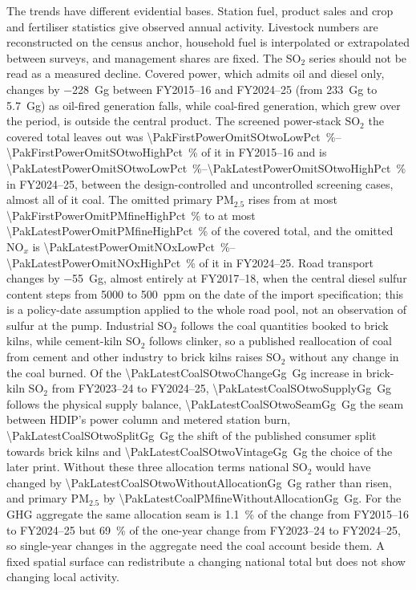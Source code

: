 \documentclass[essd,manuscript]{copernicus}
\begin{document}
The trends have different evidential bases. Station fuel, product sales and crop and fertiliser statistics give observed annual activity. Livestock numbers are reconstructed on the census anchor, household fuel is interpolated or extrapolated between surveys, and management shares are fixed. The SO$_2$ series should not be read as a measured decline. Covered power, which admits oil and diesel only, changes by \SI{-228}{\giga\gram} between FY2015--16 and FY2024--25 (from \SI{233}{\giga\gram} to \SI{5.7}{\giga\gram}) as oil-fired generation falls, while coal-fired generation, which grew over the period, is outside the central product. The screened power-stack SO$_2$ the covered total leaves out was \SIrange{\PakFirstPowerOmitSOtwoLowPct}{\PakFirstPowerOmitSOtwoHighPct}{\percent} of it in FY2015--16 and is \SIrange{\PakLatestPowerOmitSOtwoLowPct}{\PakLatestPowerOmitSOtwoHighPct}{\percent} in FY2024--25, between the design-controlled and uncontrolled screening cases, almost all of it coal. The omitted primary PM$_{2.5}$ rises from at most \SI{\PakFirstPowerOmitPMfineHighPct}{\percent} to at most \SI{\PakLatestPowerOmitPMfineHighPct}{\percent} of the covered total, and the omitted NO$_x$ is \SIrange{\PakLatestPowerOmitNOxLowPct}{\PakLatestPowerOmitNOxHighPct}{\percent} of it in FY2024--25. Road transport changes by \SI{-55}{\giga\gram}, almost entirely at FY2017--18, when the central diesel sulfur content steps from \num{5000} to \num{500}~ppm on the date of the import specification; this is a policy-date assumption applied to the whole road pool, not an observation of sulfur at the pump. Industrial SO$_2$ follows the coal quantities booked to brick kilns, while cement-kiln SO$_2$ follows clinker, so a published reallocation of coal from cement and other industry to brick kilns raises SO$_2$ without any change in the coal burned. Of the \SI{\PakLatestCoalSOtwoChangeGg}{\giga\gram} increase in brick-kiln SO$_2$ from FY2023--24 to FY2024--25, \SI{\PakLatestCoalSOtwoSupplyGg}{\giga\gram} follows the physical supply balance, \SI{\PakLatestCoalSOtwoSeamGg}{\giga\gram} the seam between HDIP's power column and metered station burn, \SI{\PakLatestCoalSOtwoSplitGg}{\giga\gram} the shift of the published consumer split towards brick kilns and \SI{\PakLatestCoalSOtwoVintageGg}{\giga\gram} the choice of the later print. Without these three allocation terms national SO$_2$ would have changed by \SI{\PakLatestCoalSOtwoWithoutAllocationGg}{\giga\gram} rather than risen, and primary PM$_{2.5}$ by \SI{\PakLatestCoalPMfineWithoutAllocationGg}{\giga\gram}. For the GHG aggregate the same allocation seam is \SI{1.1}{\percent} of the change from FY2015--16 to FY2024--25 but \SI{69}{\percent} of the one-year change from FY2023--24 to FY2024--25, so single-year changes in the aggregate need the coal account beside them. A fixed spatial surface can redistribute a changing national total but does not show changing local activity.
\end{document}
